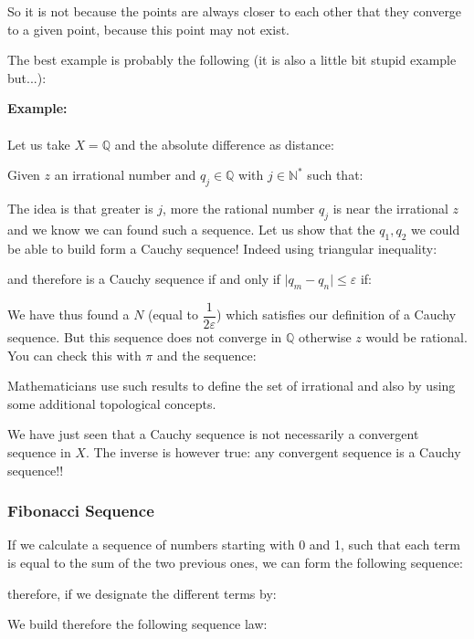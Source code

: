 	So it is not because the points are always closer to each other that they converge to a given point, because this point may not exist.
	
	The best example is probably the following (it is also a little bit stupid example but...):
	\begin{tcolorbox}[colframe=black,colback=white,sharp corners]
\textbf{{\Large {}}Example:}\\\\
Let us take $X=\mathbb{Q}$ and the absolute difference as distance:
	
	Given $z$ an irrational number and $q_j \in \mathbb{Q}$ with $j \in \mathbb{N}^{*}$ such that:
	
	The idea is that greater is $j$, more the rational number $q_j$ is near the irrational $z$ and we know we can found such a sequence.
	Let us show that the $q_1,q_2$ we could be able to build form a Cauchy sequence! Indeed using triangular inequality:
	
	and therefore is a Cauchy sequence if and only if $\vert q_m-q_n \vert\leq \varepsilon$ if:
	
	We have thus found a $N$ (equal to $\dfrac{1}{2\varepsilon}$) which satisfies our definition of a Cauchy sequence. But this sequence does not converge in $\mathbb{Q}$ otherwise $z$ would be rational.
	You can check this with $\pi$ and the sequence:
	
	\end{tcolorbox}
	
	\begin{tcolorbox}[title=Remarks,colframe=black,arc=10pt]
Mathematicians use such results to define the set of irrational and also by using some additional topological concepts.
	\end{tcolorbox}
	We have just seen that a Cauchy sequence is not necessarily a convergent sequence in $X$. The inverse is however true: any convergent sequence is a Cauchy sequence!!
	
	\subsubsection{Fibonacci Sequence}
	
	If we calculate a sequence of numbers starting with 0 and 1, such that each term is equal to the sum of the two previous ones, we can form the following sequence:
	
	therefore, if we designate the different terms by:
	
	We build therefore the following sequence law:
	
